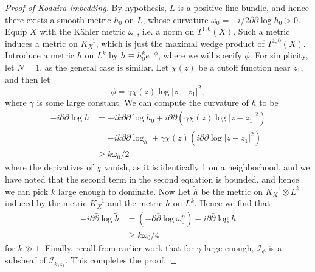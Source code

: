 \documentclass{../mathnotes}
\begin{document}
\begin{proof}[Proof of Kodaira imbedding]
     By hypothesis, $L$ is a positive line bundle, and hence there exists a smooth metric $h_0$ on $L$, whose
     curvature $\omega_0=-i/2\partial\bar\partial\log h_0>0$. Equip $X$ with the K\"ahler metric $\omega_0$,
     i.e. a norm on $T^{1,0}(X)$. Such a metric induces a metric on $K_X^{-1}$, which is just the maximal wedge
     product of $T^{1,0}(X)$. Introduce a metric $h$ on $L^k$ by $h\equiv h_0^ke^{-\phi}$, where we will specify $\phi$.
     For simplicity, let $N=1$, as the general case is similar. Let $\chi(z)$ be a cutoff function
     near $z_1$, and then let
     \[\phi=\gamma\chi(z)\log|z-z_1|^2,\]
     where $\gamma$ is some large constant. We can compute the curvature of $h$ to be
     \begin{align*}
         -i\partial\bar\partial\log h&=-ik\partial\bar\partial\log h_0+i\partial\bar\partial\left( \gamma\chi(z)\log|z-z_1|^2 \right)\\
         &=-ik\partial\bar\partial\log_h+\gamma\chi(z)\left( i\partial\bar\partial\log|z-z_1|^2 \right)\\
         &\geq k\omega_0/2
     \end{align*}
     where the derivatives of $\chi$ vanish, as it is identically 1 on a neighborhood, and we have noted
     that the second term in the second equation is bounded, and hence we can pick $k$ large enough to dominate.
     Now Let $\tilde h$ be the metric on $K_X^{-1}\otimes L^k$ induced by the metric $K^{-1}_X$ and the metric
     $h$ on $L^k$. Hence we find that
     \begin{align*}
        -i\partial\bar\partial\log\tilde h&=(-\partial\bar\partial\log\omega_0^n)-i\partial\bar\partial\log h\\
        &\geq k\omega_0/4
     \end{align*}
     for $k\gg 1$. Finally, recall from earlier work that for $\gamma$ large enough, $\mathcal{I}_\phi$ is a subsheaf
     of $\mathcal{I}_{k_1z_1}$. This completes the proof.
\end{proof}
\end{document}
